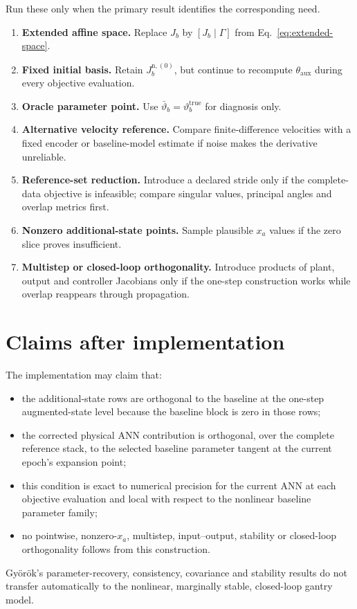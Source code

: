 \documentclass[11pt,a4paper]{article}
\begin{document}
Run these only when the primary result identifies the corresponding need.
\begin{enumerate}
    \item \textbf{Extended affine space.} Replace \(J_b\) by
    \([J_b\mid\Gamma]\) from Eq.~\eqref{eq:extended-space}.
    \item \textbf{Fixed initial basis.} Retain
    \(J_b^{\mathrm n,(0)}\), but continue to recompute
    \(\theta_{\mathrm{aux}}\) during every objective evaluation.
    \item \textbf{Oracle parameter point.} Use
    \(\bar\vartheta_b=\vartheta_b^{\mathrm{true}}\) for diagnosis only.
    \item \textbf{Alternative velocity reference.} Compare finite-difference
    velocities with a fixed encoder or baseline-model estimate if noise makes
    the derivative unreliable.
    \item \textbf{Reference-set reduction.} Introduce a declared stride only
    if the complete-data objective is infeasible; compare singular values,
    principal angles and overlap metrics first.
    \item \textbf{Nonzero additional-state points.} Sample plausible \(x_a\)
    values if the zero slice proves insufficient.
    \item \textbf{Multistep or closed-loop orthogonality.} Introduce products
    of plant, output and controller Jacobians only if the one-step construction
    works while overlap reappears through propagation.
\end{enumerate}

\section{Claims after implementation}

The implementation may claim that:
\begin{itemize}
    \item the additional-state rows are orthogonal to the baseline at the
          one-step augmented-state level because the baseline block is zero in
          those rows;
    \item the corrected physical ANN contribution is orthogonal, over the
          complete reference stack, to the selected baseline parameter tangent
          at the current epoch's expansion point;
    \item this condition is exact to numerical precision for the current ANN
          at each objective evaluation and local with respect to the nonlinear
          baseline parameter family;
    \item no pointwise, nonzero-\(x_a\), multistep, input--output, stability or
          closed-loop orthogonality follows from this construction.
\end{itemize}
Gy\"or\"ok's parameter-recovery, consistency, covariance and stability results
do not transfer automatically to the nonlinear, marginally stable, closed-loop
gantry model.



\end{document}
